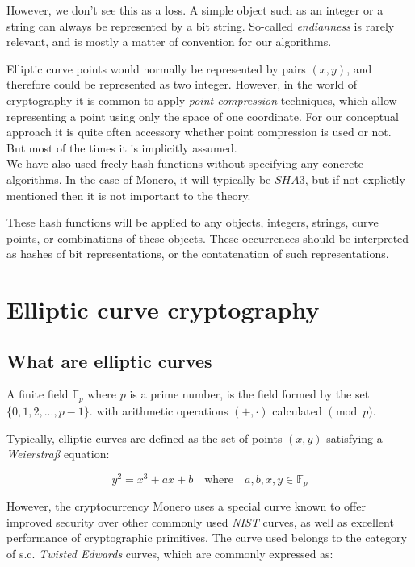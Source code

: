 However, we don't see this as a loss.
A simple object such as an integer or a string can always be represented by a bit string. 
So-called {\em endianness} is rarely relevant, and is mostly a matter of convention for our algorithms.

Elliptic curve points would normally be represented by pairs \((x, y)\), and therefore could be represented
as two integer. However, in the world of cryptography it is common to apply {\em point compression} techniques,
which allow representing a point using only the space of one coordinate.
For our conceptual approach it is quite often accessory whether point compression is used or not.
But most of the times it is implicitly assumed. 
\\

We have also used freely hash functions without specifying any concrete algorithms.
In the case of Monero,  it will typically be \(\mathit{SHA3}\), but if not explictly mentioned then it is not 
important to the theory.

These hash functions will be applied to any objects, integers, strings, curve points, or combinations of
these objects.
These occurrences should be interpreted as hashes of bit representations, or the contatenation of such
representations.




\section{Elliptic curve cryptography}
\label{EllipticCurveCryptography}

\subsection{What are elliptic curves}


A finite field \(\mathbb{F}_p\) where \(p\) is a prime number, is the field formed by the set \(\{0, 1, 2, ..., p-1\}\). with arithmetic operations \((+,  \cdot)\) calculated \( \pmod p\).


Typically, elliptic curves are defined as the set of points \((x, y)\) satisfying a {\em Weierstraß} equation:
 
\[y^2 = x^3 + a x + b \quad \textrm{where} \quad a, b, x, y \in \mathbb{F}_p \]

However, the cryptocurrency Monero uses a special curve known to offer improved security over other commonly used {\em NIST} curves, as well as excellent performance of cryptographic primitives. The curve used belongs to the category of s.c. {\em Twisted Edwards} curves, which are commonly expressed as: 

